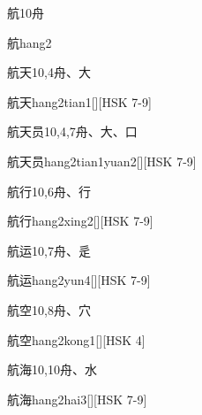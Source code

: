 \begin{Entry}{航}{10}{⾈}
  \begin{Phonetics}{航}{hang2}
  \end{Phonetics}
\end{Entry}

\begin{Entry}{航天}{10,4}{⾈、⼤}
  \begin{Phonetics}{航天}{hang2tian1}[][HSK 7-9]
  \end{Phonetics}
\end{Entry}

\begin{Entry}{航天员}{10,4,7}{⾈、⼤、⼝}
  \begin{Phonetics}{航天员}{hang2tian1yuan2}[][HSK 7-9]
  \end{Phonetics}
\end{Entry}

\begin{Entry}{航行}{10,6}{⾈、⾏}
  \begin{Phonetics}{航行}{hang2xing2}[][HSK 7-9]
  \end{Phonetics}
\end{Entry}

\begin{Entry}{航运}{10,7}{⾈、⾡}
  \begin{Phonetics}{航运}{hang2yun4}[][HSK 7-9]
  \end{Phonetics}
\end{Entry}

\begin{Entry}{航空}{10,8}{⾈、⽳}
  \begin{Phonetics}{航空}{hang2kong1}[][HSK 4]
  \end{Phonetics}
\end{Entry}

\begin{Entry}{航海}{10,10}{⾈、⽔}
  \begin{Phonetics}{航海}{hang2hai3}[][HSK 7-9]
  \end{Phonetics}
\end{Entry}

